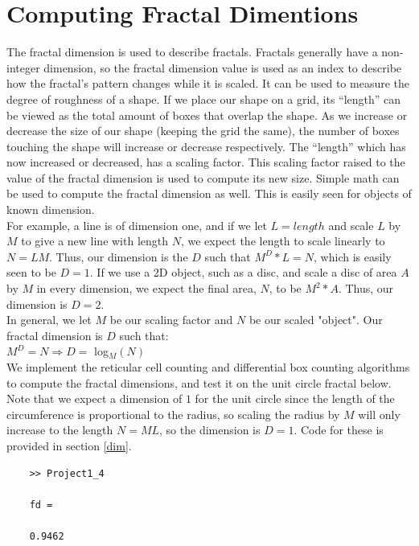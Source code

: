 \documentclass[12pt]{article}
\begin{document}
\section{Computing Fractal Dimentions}
The fractal dimension is used to describe fractals. Fractals generally have a non-integer dimension, so the fractal dimension value is used as an index to describe how the fractal’s pattern changes while it is scaled. It can be used to measure the degree of roughness of a shape. If we place our shape on a grid, its “length” can be viewed as the total amount of boxes that overlap the shape. As we increase or decrease the size of our shape (keeping the grid the same), the number of boxes touching the shape will increase or decrease respectively. The “length” which has now increased or decreased, has a scaling factor. This scaling factor raised to the value of the fractal dimension is used to compute its new size. Simple math can be used to compute the fractal dimension as well. This is easily seen for objects of known dimension.\\
For example, a line is of dimension one, and if we let $L=length$ and scale $L$ by $M$ to give a new line with length $N$, we expect the length to scale linearly to $N=LM$. Thus, our dimension is the $D$ such that $M^D*L=N$, which is easily seen to be $D=1$. If we use a 2D object, such as a disc, and scale a disc of area $A$ by $M$ in every dimension, we expect the final area, $N$, to be $M^2*A$. Thus, our dimension is $D=2$.\\ 

In general, we let $M$ be our scaling factor and $N$ be our scaled "object". Our fractal dimension is $D$ such that:  \\
$M^{D} = N \Rightarrow D =$ log$_{M}(N)$\\
\newline
We implement the reticular cell counting and differential box counting algorithms to compute the fractal dimensions, and test it on the unit circle fractal below. Note that we expect a dimension of $1$ for the unit circle since the length of the circumference is proportional to the radius, so scaling the radius by $M$ will only increase to the length $N=ML$, so the dimension is $D=1$. Code for these is provided in section \ref{dim}.

	\begin{verbatim}
	>> Project1_4
	
	fd =
	
	0.9462
	\end{verbatim}
\end{document}

